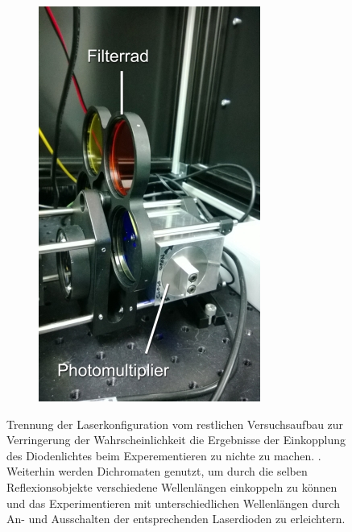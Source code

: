 \begin{figure}
\begin{subfigure}[b]{0.5\linewidth}
\end{subfigure}
\begin{subfigure}[b]{0.5\linewidth}
\includegraphics[width=0.98\linewidth]{IMAGE/pmt.png}\label{fig:pmt}
\end{subfigure}

\caption{Trennung der Laserkonfiguration vom restlichen Versuchsaufbau zur Verringerung der Wahrscheinlichkeit die Ergebnisse der Einkopplung des Diodenlichtes beim Experementieren zu nichte zu machen. \cite{Anleitung}.
	Weiterhin werden Dichromaten genutzt, um durch die selben Reflexionsobjekte verschiedene Wellenlängen einkoppeln zu können und das Experimentieren mit unterschiedlichen Wellenlängen durch An- und Ausschalten der entsprechenden Laserdioden zu erleichtern. \\}
\end{figure}
